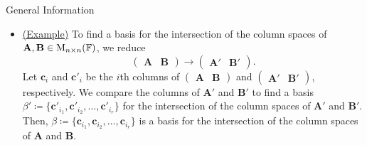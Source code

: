 \begin{stbox}{General Information}
\begin{itemize}
        \item \href{https://math.stackexchange.com/a/802878}{(Example)} To find a basis for the intersection of the column spaces of \(\mathbf{A},\mathbf{B}\in\operatorname{M}_{n \times n}(\mathbb{F})\), we reduce
        \[\begin{pmatrix}
            \mathbf{A}&\mathbf{B}
        \end{pmatrix}\to
        \begin{pmatrix}
            \mathbf{A'}&\mathbf{B'}
        \end{pmatrix}.\]
        Let \(\mathbf{c}_i\) and \(\mathbf{c'}_i\) be the \(i\)th columns of 
        \(\begin{pmatrix}
            \mathbf{A}&\mathbf{B}
        \end{pmatrix}\) and
        \(\begin{pmatrix}
            \mathbf{A'}&\mathbf{B'}
        \end{pmatrix}\), respectively.
        We compare the columns of \(\mathbf{A'}\) and \(\mathbf{B'}\) to find a basis \(\beta'\coloneq\{\mathbf{c}'_{i_1},\mathbf{c}'_{i_2},\dots,\mathbf{c}'_{i_r}\}\) for the intersection of the column spaces of \(\mathbf{A'}\) and \(\mathbf{B'}\). Then, \(\beta\coloneq\{\mathbf{c}_{i_1},\mathbf{c}_{i_2},\dots,\mathbf{c}_{i_r}\}\) is a basis for the intersection of the column spaces of \(\mathbf{A}\) and \(\mathbf{B}\).

\end{itemize}
\end{stbox}
